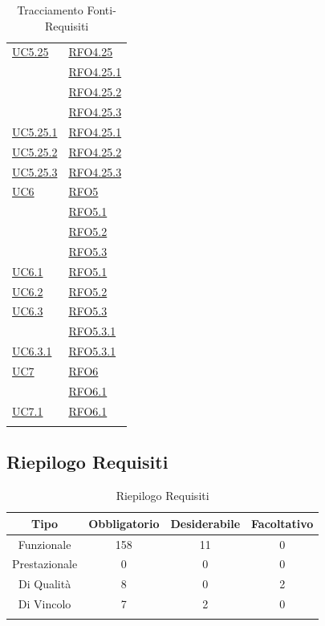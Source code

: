 \begin{longtable}{|>{\centering}m{5cm}|m{5cm}<{\centering}|}
\hyperref[UC5.25]{UC5.25} & \hyperlink{RFO4.25}{RFO4.25}\\
& \hyperlink{RFO4.25.1}{RFO4.25.1}\\
& \hyperlink{RFO4.25.2}{RFO4.25.2}\\
& \hyperlink{RFO4.25.3}{RFO4.25.3}\\ \hline
\hyperref[UC5.25.1]{UC5.25.1} & \hyperlink{RFO4.25.1}{RFO4.25.1}\\\hline
\hyperref[UC5.25.2]{UC5.25.2} & \hyperlink{RFO4.25.2}{RFO4.25.2}\\\hline
\hyperref[UC5.25.3]{UC5.25.3} & \hyperlink{RFO4.25.3}{RFO4.25.3}\\\hline

\hyperref[UC6]{UC6} & \hyperlink{RFO5}{RFO5}\\
 & \hyperlink{RFO5.1}{RFO5.1}\\
 & \hyperlink{RFO5.2}{RFO5.2}\\
 & \hyperlink{RFO5.3}{RFO5.3}\\ \hline
 \hyperref[UC6.1]{UC6.1} & \hyperlink{RFO5.1}{RFO5.1}\\ \hline
 \hyperref[UC6.2]{UC6.2} & \hyperlink{RFO5.2}{RFO5.2}\\ \hline
 \hyperref[UC6.3]{UC6.3} & \hyperlink{RFO5.3}{RFO5.3}\\
 & \hyperlink{RFO5.3.1}{RFO5.3.1}\\ \hline
  \hyperref[UC6.3.1]{UC6.3.1} & \hyperlink{RFO5.3.1}{RFO5.3.1}\\ \hline
\hyperref[UC7]{UC7} & \hyperlink{RFO6}{RFO6}\\
& \hyperlink{RFO6.1}{RFO6.1}\\ \hline
\hyperref[UC7.1]{UC7.1} & \hyperlink{RFO6.1}{RFO6.1}\\ \hline

\caption[Tracciamento Fonti-Requisiti]{Tracciamento Fonti-Requisiti}
\label{tabella:fonti-requi}
\end{longtable}
\clearpage

\subsection{Riepilogo Requisiti}
\normalsize
\begin{longtable}{|c|c|c|c|}
\hline
\textbf{Tipo} & \textbf{Obbligatorio} & \textbf{Desiderabile} & \textbf{Facoltativo}\\
\hline
Funzionale & 158 & 11 & 0\\ \hline
Prestazionale & 0 & 0 & 0\\ \hline
Di Qualità & 8 & 0 & 2\\ \hline
Di Vincolo & 7 & 2 & 0\\ \hline
\caption[Riepilogo Requisiti]{Riepilogo Requisiti}
\label{tabella:riepilogorequi}
\end{longtable}
\clearpage





